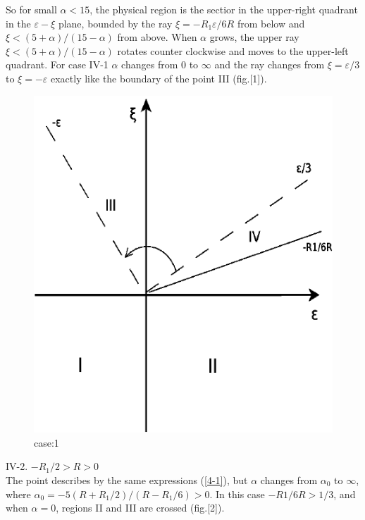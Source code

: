 \documentclass[12pt]{article}
\begin{document}
So for small $\alpha<15$, the physical region is the sectior in the upper-right quadrant in the $\varepsilon-\xi$
plane, bounded by the ray $\xi=-R_1\varepsilon/6R$ from below and $\xi<(5+\alpha)/(15-\alpha)$
from above. 
When $\alpha$ grows, the upper ray $\xi<(5+\alpha)/(15-\alpha)$ rotates counter clockwise
and moves to the upper-left quadrant. For case IV-1 $\alpha$ changes from 0 to $\infty$ and the ray
changes from $\xi=\varepsilon/3$ to $\xi=-\varepsilon$ exactly like the boundary of the point III (fig.[1]).\\
\begin{figure}
 \includegraphics{./Diagram1.pdf}
 \caption{case:1}
 \label{fig:1}
\end{figure}


IV-2. $-R_1/2>R>0$ \\
The point describes by the same expressions (\ref{4-1}), but $\alpha$ changes from $\alpha_{0}$ to $\infty$,
where $\alpha_{0}=-5(R+R_1/2)/(R-R_1/6)>0$. In this case $-R1/6R>1/3$, and when $\alpha=0$, regions II and III
 are crossed (fig.[2]).
\end{document}
